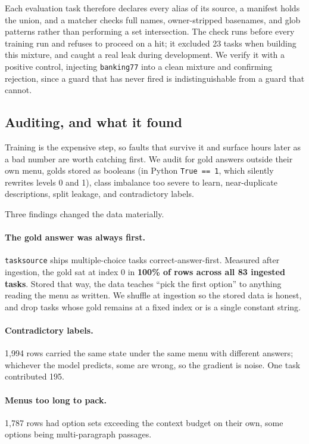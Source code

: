 Each evaluation task therefore declares every alias of its source, a
manifest holds the union, and a matcher checks full names, owner-stripped
basenames, and glob patterns rather than performing a set intersection.
The check runs before every training run and refuses to proceed on a hit;
it excluded 23 tasks when building this mixture, and caught a real leak
during development. We verify it with a positive control, injecting
\texttt{banking77} into a clean mixture and confirming rejection, since
a guard that has never fired is indistinguishable from a guard that
cannot.

\subsection{Auditing, and what it found}
\label{sec:data-audit}

Training is the expensive step, so faults that survive it and surface
hours later as a bad number are worth catching first. We audit for gold
answers outside their own menu, \score{} golds stored as booleans (in
Python \texttt{True == 1}, which silently rewrites levels 0 and 1), class
imbalance too severe to learn, near-duplicate \noul{} descriptions, split
leakage, and contradictory labels.

Three findings changed the data materially.

\paragraph{The gold answer was always first.} \texttt{tasksource} ships
multiple-choice tasks correct-answer-first. Measured after ingestion, the
gold sat at index $0$ in \textbf{100\% of rows across all 83 ingested
tasks}. Stored that way, the data teaches ``pick the first option'' to
anything reading the menu as written. We shuffle at ingestion so the
stored data is honest, and drop tasks whose gold remains at a fixed index
or is a single constant string.

\paragraph{Contradictory labels.} 1{,}994 rows carried the same state under
the same menu with different answers; whichever the model predicts, some
are wrong, so the gradient is noise. One task contributed 195.

\paragraph{Menus too long to pack.} 1{,}787 rows had option sets exceeding
the context budget on their own, some options being multi-paragraph
passages.

